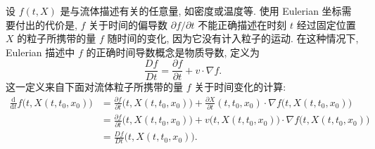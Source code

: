 设 $f(t,X)$ 是与流体描述有关的任意量, 如密度或温度等. 使用 Eulerian 坐标需要付出的代价是, $f$ 关于时间的偏导数 $\partial f/\partial t$ 不能正确描述在时刻 $t$ 经过固定位置 $X$ 的粒子所携带的量 $f$ 随时间的变化, 因为它没有计入粒子的运动. 在这种情况下, Eulerian 描述中 $f$ 的正确时间导数概念是物质导数, 定义为
\begin{equation}
\label{eq:chap1-material-derivative}
  \frac{Df}{Dt}=\frac{\partial f}{\partial t}+v\cdot\nabla f.
\end{equation}
这一定义来自下面对流体粒子所携带的量 $f$ 关于时间变化的计算:
\begin{align*}
  \frac{\mathrm{d}}{\mathrm{d}t}f\bigl(t,X(t,t_0,x_0)\bigr)
  &=\frac{\partial f}{\partial t}\bigl(t,X(t,t_0,x_0)\bigr)
    +\frac{\partial X}{\partial t}(t,t_0,x_0)\cdot
      \nabla f\bigl(t,X(t,t_0,x_0)\bigr)\\
  &=\frac{\partial f}{\partial t}\bigl(t,X(t,t_0,x_0)\bigr)
    +v\bigl(t,X(t,t_0,x_0)\bigr)\cdot
      \nabla f\bigl(t,X(t,t_0,x_0)\bigr)\\
  &=\frac{Df}{Dt}\bigl(t,X(t,t_0,x_0)\bigr).
\end{align*}
